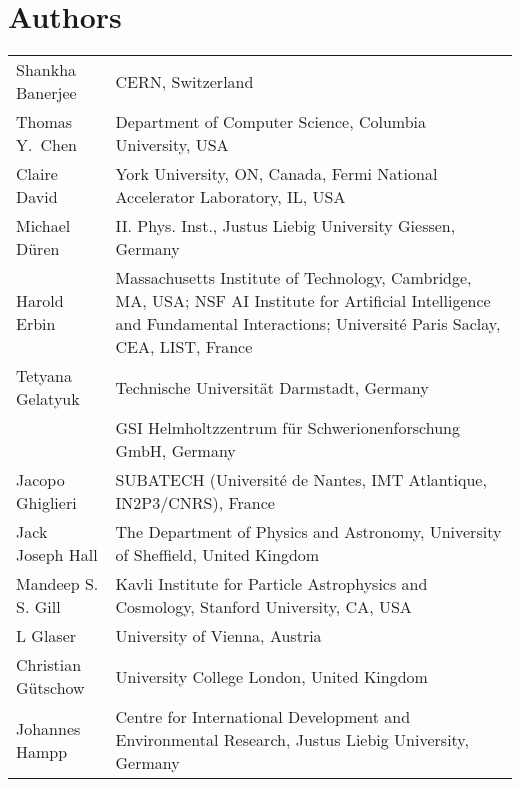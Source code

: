 \documentclass[../SustainableHEP.tex]{subfiles}
\begin{document}
\newpage


\section*{Authors}
{}
\renewcommand{\arraystretch}{1.5}
\noindent\begin{longtable*}{@{}m{0.3\textwidth} p{0.7\textwidth}}
Shankha Banerjee & CERN, Switzerland\\ %

Thomas Y.\ Chen & Department of Computer Science, Columbia University, USA\\

Claire David & York University, ON, Canada, Fermi National Accelerator Laboratory, IL, USA\\

Michael Düren & II. Phys. Inst., Justus Liebig University Giessen, Germany\\ %

Harold Erbin & Massachusetts Institute of Technology, Cambridge, MA, USA; NSF AI Institute for Artificial Intelligence and Fundamental Interactions; Université Paris Saclay, CEA, LIST, France\\ %

Tetyana Gelatyuk & Technische Universität Darmstadt,  Germany\\ %
& GSI Helmholtzzentrum für Schwerionenforschung GmbH, Germany\\ %

Jacopo Ghiglieri & SUBATECH (Universit\'e de Nantes, IMT Atlantique, IN2P3/CNRS), France\\ %

Jack Joseph Hall & The Department of Physics and Astronomy, University of Sheffield, United Kingdom\\

Mandeep S. S. Gill & Kavli Institute for Particle Astrophysics and Cosmology, Stanford University, CA, USA \\ %

L Glaser & University of Vienna, Austria \\ %

Christian G\"utschow & University College London, United Kingdom\\

Johannes Hampp & Centre for International Development and Environmental Research, Justus Liebig University, Germany\\ %


\end{longtable*}
\end{document}
